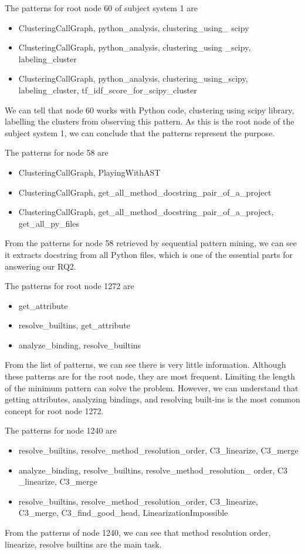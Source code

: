 The patterns for root node 60 of subject system 1 are

\begin{itemize}
    \item ClusteringCallGraph, python\_analysis, clustering\_using\_
    scipy
    \item ClusteringCallGraph, python\_analysis, clustering\_using
    \_scipy, labeling\_cluster
    \item ClusteringCallGraph, python\_analysis, clustering\_using\_scipy,
labeling\_cluster, tf\_idf\_score\_for\_scipy\_cluster
\end{itemize}
We can tell that node 60 works with Python code, clustering using scipy library, labelling the clusters from observing this pattern. As this is the root node of the subject system 1, we can conclude that the patterns represent the purpose.

The patterns for node 58 are 

\begin{itemize}
    \item ClusteringCallGraph, PlayingWithAST
    \item ClusteringCallGraph, get\_all\_method\_docstring\_pair\_of\_a\_project
    \item ClusteringCallGraph, get\_all\_method\_docstring\_pair\_of\_a\_project, get\_all\_py\_files
\end{itemize}
From the patterns for node 58 retrieved by sequential pattern mining, we can see it extracts docstring from all Python files, which is one of the essential parts for answering our RQ2. 

The patterns for root node 1272 are

\begin{itemize}
    \item get\_attribute
    \item resolve\_builtins, get\_attribute
    \item analyze\_binding, resolve\_builtins
\end{itemize}

From the list of patterns, we can see there is very little information. Although these patterns are for the root node, they are most frequent. Limiting the length of the minimum pattern can solve the problem. However, we can understand that getting attributes, analyzing bindings, and resolving built-ins is the most common concept for root node 1272.

The patterns for node 1240 are 
\begin{itemize}
    \item resolve\_builtins, resolve\_method\_resolution\_order, 
    C3\_linearize, C3\_merge
    \item analyze\_binding, resolve\_builtins, resolve\_method\_resolution\_
    order, C3
    \_linearize, C3\_merge
    \item resolve\_builtins, resolve\_method\_resolution\_order,
    C3\_linearize, C3\_merge, C3\_find\_good\_head, LinearizationImpossible
\end{itemize}
From the patterns of node 1240, we can see that method resolution order, linearize, resolve builtins are the main task.

